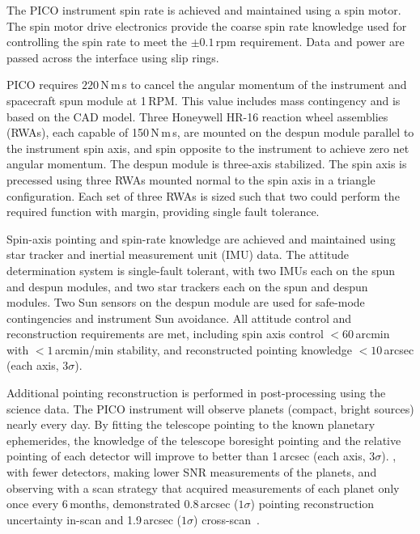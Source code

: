 The PICO instrument spin rate is achieved and maintained using a spin motor. The spin motor drive electronics provide the coarse spin rate knowledge used for controlling the spin rate to meet the $\pm0.1$\,rpm requirement. Data and power are passed across the interface using slip rings.

PICO requires $220$\,N\,m\,s to cancel the angular momentum of the instrument and spacecraft spun module at 1\,RPM. This value includes mass contingency and is based on the CAD model. Three Honeywell HR-16 reaction wheel assemblies (RWAs), each capable of 150\,N\,m\,s, are mounted on the despun module parallel to the instrument spin axis, and spin opposite to the instrument to achieve zero net angular momentum. The despun module is three-axis stabilized. The spin axis is precessed using three RWAs mounted normal to the spin axis in a triangle configuration. Each set of three RWAs is sized such that two could perform the required function with margin, providing single fault tolerance.

Spin-axis pointing and spin-rate knowledge are achieved and maintained using star tracker and inertial measurement unit (IMU) data. The attitude determination system is single-fault tolerant, with two IMUs each on the spun and despun modules, and two star trackers each on the spun and despun modules. Two Sun sensors on the despun module are used for safe-mode contingencies and instrument Sun avoidance. All attitude control and reconstruction requirements are met, including spin axis control $< 60$\,arcmin with $< 1$\,arcmin/min stability, and reconstructed pointing knowledge $< 10$\,arcsec (each axis, $3\sigma$).

Additional pointing reconstruction is performed in post-processing using the science data.  The PICO instrument will observe planets (compact, bright sources) nearly every day.  By fitting the telescope pointing to the known planetary ephemerides, the knowledge of the telescope boresight pointing and the relative pointing of each detector will improve to better than 1\,arcsec (each axis, $3\sigma$). \planck , with fewer detectors, making lower \ac{SNR} measurements of the planets, and observing with a scan strategy that acquired measurements of each planet only once every 6\,months, demonstrated 0.8\,arcsec ($1\sigma$) pointing reconstruction uncertainty in-scan and 1.9\,arcsec ($1\sigma$) cross-scan~\citep{2016A&A...594A...1P}.

